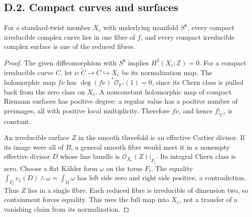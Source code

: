 \subsection{D.2. Compact curves and surfaces}
\begin{proposition}[D.2.1; Proved]\label{st:D.2.1}
For a standard-twist member \(X_c\) with underlying manifold \(S^6\),
every compact irreducible complex curve lies in one fibre of \(f\), and
every compact irreducible complex surface is one of the reduced fibres.
\end{proposition}
\begin{proof}
The given diffeomorphism with \(S^6\) implies \(H^2(X_c;\mathbb Z)=0\).
For a compact irreducible curve \(C\), let
\(\nu:\widetilde C\to C\hookrightarrow X_c\) be its normalization map.
The holomorphic map \(f\nu\) has
\(\deg (f\nu)^*\mathcal O_{\mathbb P^1}(1)=0\), since its Chern class is
pulled back from the zero class on \(X_c\). A nonconstant holomorphic map
of compact Riemann surfaces has positive degree: a regular value has a
positive number of preimages, all with positive local multiplicity.
Therefore \(f\nu\), and hence \(f|_C\), is constant.

An irreducible surface \(Z\) in the smooth threefold is an effective
Cartier divisor. If its image were all of \(B\), a general smooth fibre
would meet it in a nonempty effective divisor \(D\) whose line bundle
is \(\mathcal O_{X_c}(Z)|_{F_t}\). Its integral Chern class is zero.
Choose a flat K\"ahler form \(\omega\) on the torus \(F_t\). The equality
\(\int_{F_t}c_1(D)\wedge\omega=\int_D\omega\) has left side zero and right
side positive, a contradiction. Thus \(Z\) lies in a single fibre.
Each reduced fibre is irreducible of dimension two, so containment forces
equality. This uses the full map into \(X_c\), not a transfer of a
vanishing claim from its normalization.
\end{proof}

